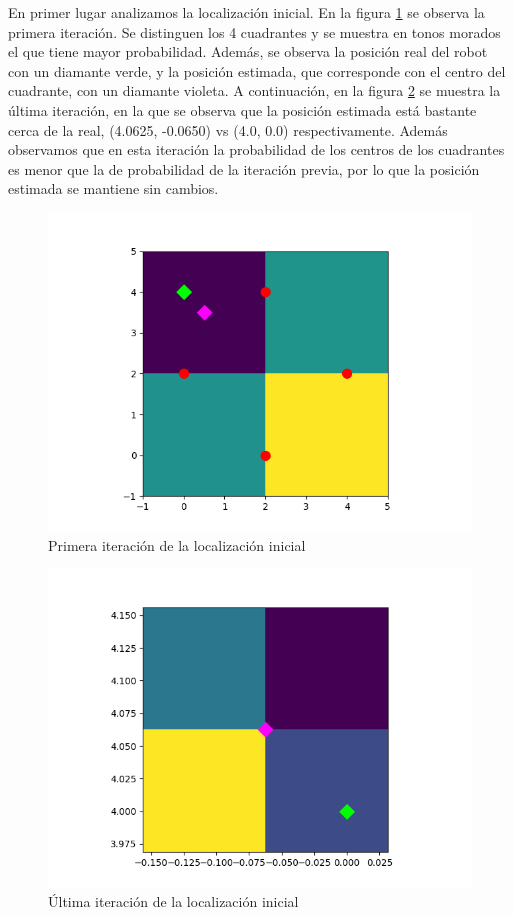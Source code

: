 \bigskip En primer lugar analizamos la localización inicial. En la figura \ref{fig:localizacion_ej1} se observa la primera iteración. Se distinguen los 4 cuadrantes y se muestra en tonos morados el que tiene mayor probabilidad.
Además, se observa la posición real del robot con un diamante verde, y la posición estimada, que corresponde con el centro del cuadrante, con un diamante violeta.
A continuación, en la figura \ref{fig:localizacion_ej2} se muestra la última iteración, en la que se observa que la posición estimada está bastante cerca de la real, (4.0625, -0.0650) vs (4.0, 0.0) respectivamente. Además observamos que en esta iteración la probabilidad de los centros de los cuadrantes es menor que la de probabilidad de la iteración previa, por lo que la posición estimada se mantiene sin cambios.
\begin{figure}[htb]
  \centering
  \includegraphics[width=1\linewidth]{images/localizacion7.png}
  \caption{Primera iteración de la localización inicial}
  \label{fig:localizacion_ej1}
\end{figure}
\begin{figure}[htb]
  \centering
  \includegraphics[width=1\linewidth]{images/localizacion8.png}
  \caption{Última iteración de la localización inicial}
  \label{fig:localizacion_ej2}
\end{figure}


